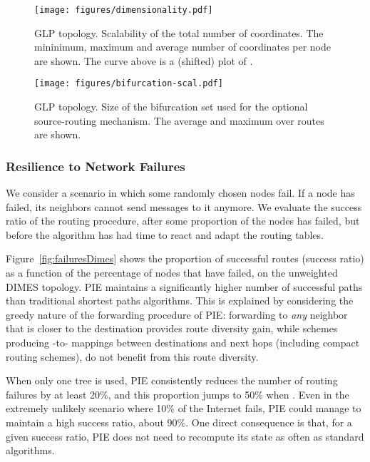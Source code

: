 \documentclass[conference]{IEEEtran}
\begin{document}
\begin{figure}[t]
\centering
\texttt{[image: figures/dimensionality.pdf]}\vspace{-1em}
\caption{GLP topology. Scalability of the total number of coordinates. The mininimum, maximum and average number of coordinates per node are shown. The curve above is a (shifted) plot of .}
\label{fig:scalGLP}
\end{figure}

\begin{figure}[t]
\centering
\texttt{[image: figures/bifurcation-scal.pdf]}\vspace{-1em}
\caption{GLP topology. Size of the bifurcation set used for the optional source-routing mechanism. The average and maximum over  routes are shown.}
\vspace{-1.1em}
\label{fig:bif}
\end{figure}

\subsubsection{Resilience to Network Failures}

We consider a scenario in which some randomly chosen nodes fail. If a node has failed, its neighbors cannot send messages to it anymore. We evaluate the success ratio of the routing procedure, after some proportion of the nodes has failed, but before the algorithm has had time to react and adapt the routing tables.

Figure~\ref{fig:failuresDimes} shows the proportion of successful routes (success ratio) as a function of the percentage of nodes that have failed, on the unweighted DIMES topology. PIE maintains a significantly higher number of successful paths than traditional shortest paths algorithms. This is explained by considering the greedy nature of the forwarding procedure of PIE: forwarding to \emph{any} neighbor that is closer to the destination provides
route diversity gain, while schemes producing -to- mappings between destinations and next hops (including compact routing schemes), do not benefit from this route diversity.

When only one tree is used, PIE consistently reduces the number of routing failures by at least 20\%, and this proportion jumps to 50\% when .
Even in the extremely unlikely scenario where 10\% of the Internet fails, PIE could manage to maintain a high success ratio, about 90\%.
One direct consequence is that, for a given success ratio, PIE does not need to recompute its state as often as standard algorithms.
\end{document}
